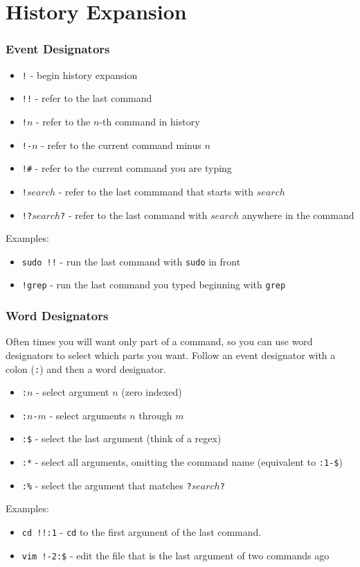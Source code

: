 \documentclass{beamer}
\begin{document}
\section{History Expansion}
\begin{frame}
    \frametitle{Event Designators}
    \begin{itemize}[<+->]
        \item \texttt{!} - begin history expansion
        \item \texttt{!!} - refer to the last command
        \item \texttt{!$n$} - refer to the $n$-th command in history
        \item \texttt{!-$n$} - refer to the current command minus $n$
        \item \texttt{!\#} - refer to the current command you are typing
        \item \texttt{!$search$} - refer to the last commmand that starts with
            $search$
        \item[] \texttt{!?$search$?} - refer to the last command with $search$
            anywhere in the command
    \end{itemize}
    \pause
    Examples:
    \begin{itemize}[<+->]
        \item \texttt{sudo !!} - run the last command with \texttt{sudo} in
            front
        \item \texttt{!grep} - run the last command you typed beginning with
            \texttt{grep}
    \end{itemize}
\end{frame}

\begin{frame}
    \frametitle{Word Designators}
    Often times you will want only part of a command, so you can use word
    designators to select which parts you want.\pause{} Follow an event designator with
    a colon (\texttt{:}) and then a word designator.
    \pause
    \begin{itemize}[<+->]
        \item \texttt{:$n$} - select argument $n$ (zero indexed)
        \item \texttt{:$n$-$m$} - select arguments $n$ through $m$
        \item \texttt{:\$} - select the last argument (think of a regex)
        \item \texttt{:*} - select all arguments, omitting the command name
            (equivalent to \texttt{:1-\$})
        \item[] \texttt{:\%} - select the argument that matches
                \texttt{?$search$?}
    \end{itemize}
    \pause
    Examples:
    \begin{itemize}[<+->]
        \item \texttt{cd !!:1} - \texttt{cd} to the first argument of the last
            command.
        \item \texttt{vim !-2:\$} - edit the file that is the last argument of
            two commands ago
    \end{itemize}
\end{frame}
\end{document}
